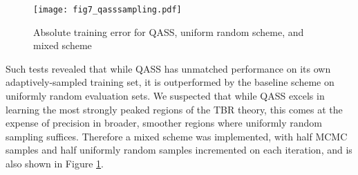 \begin{figure}[h]
  \centering
    \texttt{[image: fig7\_qasssampling.pdf]}
    \caption{Absolute training error for QASS, uniform random scheme, and mixed scheme}
  \label{fig:qasssampling}
\end{figure}

Such tests revealed that while QASS has unmatched performance on its own adaptively-sampled training set, it is outperformed by the baseline scheme on uniformly random evaluation sets. We suspected that while QASS excels in learning the most strongly peaked regions of the TBR theory, this comes at the expense of precision in broader, smoother regions where uniformly random sampling suffices. Therefore a mixed scheme was implemented, with half MCMC samples and half uniformly random samples incremented on each iteration, and is also shown in Figure \ref{fig:qasssampling}.
